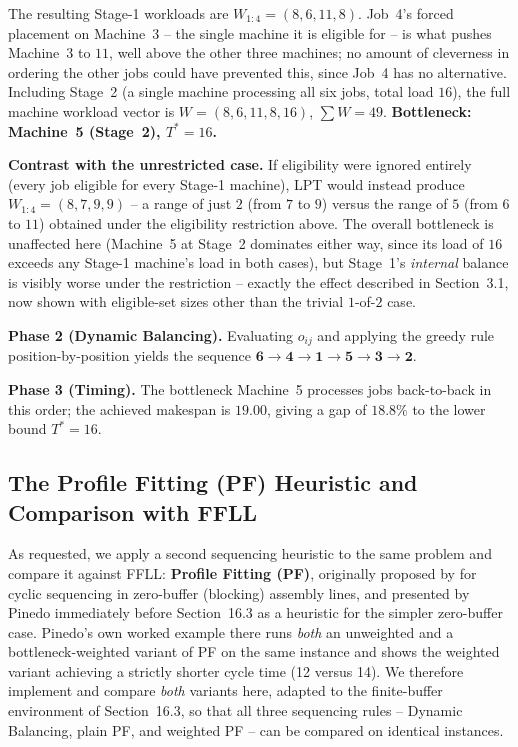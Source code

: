 \documentclass[11pt,a4paper]{article}
\begin{document}
The resulting Stage-1 workloads are $W_{1:4} = (8,6,11,8)$. Job~4's
forced placement on Machine~3 -- the single machine it is eligible for
-- is what pushes Machine~3 to $11$, well above the other three
machines; no amount of cleverness in ordering the other jobs could have
prevented this, since Job~4 has no alternative. Including Stage~2 (a
single machine processing all six jobs, total load $16$), the full
machine workload vector is $W=(8,6,11,8,16)$, $\sum W = 49$.
\textbf{Bottleneck: Machine~5 (Stage~2), $T^\ast = 16$.}

\textbf{Contrast with the unrestricted case.} If eligibility were
ignored entirely (every job eligible for every Stage-1 machine), LPT
would instead produce $W_{1:4} = (8,7,9,9)$ -- a range of just $2$
(from $7$ to $9$) versus the range of $5$ (from $6$ to $11$) obtained
under the eligibility restriction above. The overall bottleneck is
unaffected here (Machine~5 at Stage~2 dominates either way, since its
load of $16$ exceeds any Stage-1 machine's load in both cases), but
Stage~1's \emph{internal} balance is visibly worse under the
restriction -- exactly the effect described in Section~3.1, now shown
with eligible-set sizes other than the trivial $1$-of-$2$ case.

\textbf{Phase 2 (Dynamic Balancing).} Evaluating $o_{ij}$ and applying
the greedy rule position-by-position yields the sequence
$\mathbf{6 \to 4 \to 1 \to 5 \to 3 \to 2}$.

\textbf{Phase 3 (Timing).} The bottleneck Machine~5 processes jobs
back-to-back in this order; the achieved makespan is $19.00$, giving a
gap of $18.8\%$ to the lower bound $T^\ast=16$.

\subsection{The Profile Fitting (PF) Heuristic and Comparison with FFLL}

As requested, we apply a second sequencing heuristic to the same problem
and compare it against FFLL: \textbf{Profile Fitting (PF)}, originally
proposed by \citet{mccormick1989sequencing} for cyclic sequencing in
zero-buffer (blocking) assembly lines, and presented by Pinedo
immediately before Section~16.3 as a heuristic for the simpler
zero-buffer case. Pinedo's own worked example there runs \emph{both} an
unweighted and a bottleneck-weighted variant of PF on the same instance
and shows the weighted variant achieving a strictly shorter cycle time
(12 versus 14). We therefore implement and compare \emph{both} variants
here, adapted to the finite-buffer environment of Section~16.3, so that
all three sequencing rules -- Dynamic Balancing, plain PF, and weighted
PF -- can be compared on identical instances.
\end{document}
